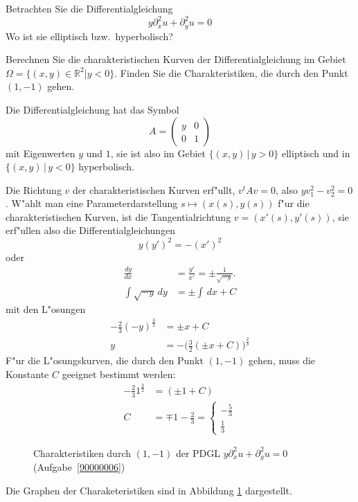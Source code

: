 Betrachten Sie die Differentialgleichung
\[
y\partial_x^2u+\partial_y^2u=0
\]
Wo ist sie elliptisch bzw.~hyperbolisch?

Berechnen Sie die charakteristischen Kurven der Differentialgleichung
im Gebiet $\Omega=\{(x,y)\in\mathbb R^2|y<0\}$.
Finden Sie die Charakteristiken, die durch den Punkt
$(1,-1)$ gehen.

\begin{loesung}
Die Differentialgleichung hat das Symbol
\[
A=\begin{pmatrix}y&0\\0&1\end{pmatrix}
\]
mit Eigenwerten $y$ und $1$, sie ist also im Gebiet $\{(x,y)\,|\,y>0\}$
elliptisch und in $\{(x,y)\,|\,y<0\}$ hyperbolisch.

Die Richtung $v$ der charakteristischen Kurven erf"ullt,
$v^tAv=0$, also $yv_1^2-v_2^2=0$. W"ahlt man eine
Parameterdarstellung $s\mapsto(x(s),y(s))$ f"ur die
charakteristischen Kurven, ist die Tangentialrichtung
$v=(x'(s),y'(s))$,
sie erf"ullen also
die Differentialgleichungen
\[
y(y')^2=-(x')^2
\]
oder
\begin{align*}
\frac{dy}{dx}&=\frac{y'}{x'}=\pm\frac1{\sqrt{-y}}.
\\
\int\sqrt{-y}\,dy&=\pm\int \,dx+C
\end{align*}
mit den L"osungen
\begin{align*}
-\frac23(-y)^{\frac32}&=\pm x+C
\\
y&=-\biggl(\frac32(\pm x+C)\biggr)^{\frac23}
\end{align*}
F"ur die L"osungskurven, die durch den Punkt $(1,-1)$ gehen,
muss die Konstante $C$ geeignet bestimmt werden:
\begin{align*}
-\frac231^{\frac32}&=(\pm1+C)\\
C&=\mp 1-\frac23
=\begin{cases}
-\frac53\\
\frac13
\end{cases}
\end{align*}
\begin{figure}
\begin{center}
\end{center}
\caption{Charakteristiken durch $(1,-1)$ der PDGL $y\partial_x^2u+\partial_y^2u=0$ (Aufgabe~\ref{90000006})
\label{90000006:char}}
\end{figure}
Die Graphen der Charaketeristiken sind in Abbildung \ref{90000006:char}
dargestellt.
\end{loesung}
